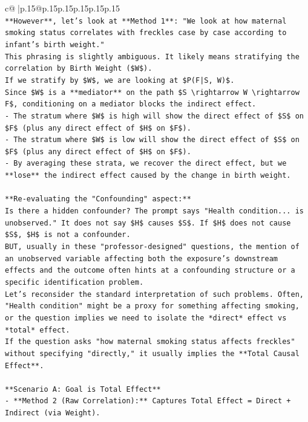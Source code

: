 \documentclass{article}
\begin{document}
{\begin{supertabular}{c@{$\;$}|p{.15\linewidth}@{}p{.15\linewidth}p{.15\linewidth}p{.15\linewidth}p{.15\linewidth}p{.15\linewidth}}
{{{\\ 
\texttt{**However**, let's look at **Method 1**: "We look at how maternal smoking status correlates with freckles case by case according to infant's birth weight."} \\
\texttt{This phrasing is slightly ambiguous. It likely means stratifying the correlation by Birth Weight (\$W\$).} \\
\texttt{If we stratify by \$W\$, we are looking at \$P(F|S, W)\$.} \\
\texttt{Since \$W\$ is a **mediator** on the path \$S \textbackslash{}rightarrow W \textbackslash{}rightarrow F\$, conditioning on a mediator blocks the indirect effect.} \\
\texttt{{-}   The stratum where \$W\$ is high will show the direct effect of \$S\$ on \$F\$ (plus any direct effect of \$H\$ on \$F\$).} \\
\texttt{{-}   The stratum where \$W\$ is low will show the direct effect of \$S\$ on \$F\$ (plus any direct effect of \$H\$ on \$F\$).} \\
\texttt{{-}   By averaging these strata, we recover the direct effect, but we **lose** the indirect effect caused by the change in birth weight.} \\
\\ 
\texttt{**Re{-}evaluating the "Confounding" aspect:**} \\
\texttt{Is there a hidden confounder? The prompt says "Health condition... is unobserved." It does not say \$H\$ causes \$S\$. If \$H\$ does not cause \$S\$, \$H\$ is not a confounder.} \\
\texttt{BUT, usually in these "professor{-}designed" questions, the mention of an unobserved variable affecting both the exposure's downstream effects and the outcome often hints at a confounding structure or a specific identification problem.} \\
\texttt{Let's reconsider the standard interpretation of such problems. Often, "Health condition" might be a proxy for something affecting smoking, or the question implies we need to isolate the *direct* effect vs *total* effect.} \\
\texttt{If the question asks "how maternal smoking status affects freckles" without specifying "directly," it usually implies the **Total Causal Effect**.} \\
\\ 
\texttt{**Scenario A: Goal is Total Effect**} \\
\texttt{{-}   **Method 2 (Raw Correlation):** Captures Total Effect = Direct + Indirect (via Weight).} \\
}}}
\end{supertabular}}
\end{document}
